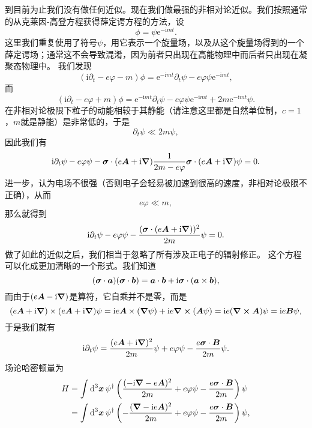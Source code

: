 \documentclass[hyperref, UTF8, a4paper]{ctexart}
\newcommand*{\ii}{\mathrm{i}}
\newcommand*{\ee}{\mathrm{e}}
\begin{document}
到目前为止我们没有做任何近似。现在我们做最强的非相对论近似。我们按照通常的从克莱因-高登方程获得薛定谔方程的方法，设
\[
    \phi = \psi \ee^{-\ii m t}.
\]
这里我们重复使用了符号$\psi$，用它表示一个旋量场，以及从这个旋量场得到的一个薛定谔场；通常这不会导致混淆，因为前者只出现在高能物理中而后者只出现在凝聚态物理中。
我们发现
\[
    (\ii \partial_t - e \varphi - m) \phi = \ee^{-\ii m t} \partial_t \psi - e \varphi \psi \ee^{-\ii m t},
\]
而
\[
    (\ii \partial_t - e \varphi + m) \phi = \ee^{-\ii m t} \partial_t \psi - e \varphi \psi \ee^{-\ii m t} + 2 m \ee^{-\ii m t} \psi.
\]
在非相对论极限下粒子的动能相较于其静能（请注意这里都是自然单位制，$c=1$，$m$就是静能）是非常低的，于是
\[
    \partial_t \psi \ll 2m \psi,
\]
因此我们有
\[
    \ii \partial_t \psi - e \varphi \psi - \vb*{\sigma} \cdot (e\vb*{A} + \ii \grad) \frac{1}{2m - e\varphi} \vb*{\sigma} \cdot (e\vb*{A} + \ii \grad) \psi = 0.
\]
进一步，认为电场不很强（否则电子会轻易被加速到很高的速度，非相对论极限不正确），从而
\[
    e \varphi \ll m,
\]
那么就得到
\begin{equation}
    \ii \partial_t \psi - e \varphi \psi - \frac{(\vb*{\sigma} \cdot (e\vb*{A} + \ii \grad))^2}{2m} \psi = 0.
\end{equation}
做了如此的近似之后，我们相当于忽略了所有涉及正电子的辐射修正。
这个方程可以化成更加清晰的一个形式。我们知道
\[
    (\vb*{\sigma} \cdot \vb*{a}) (\vb*{\sigma} \cdot \vb*{b}) = \vb*{a} \cdot \vb*{b} + \ii \vb*{\sigma} \cdot (\vb*{a} \times \vb*{b}),
\]
而由于$(e\vb*{A} - \ii \grad)$是算符，它自乘并不是零，而是
\[
    (e\vb*{A} + \ii \grad) \times (e\vb*{A} + \ii \grad) \psi = \ii e \vb*{A} \times (\grad{\psi}) + \ii e \curl{(\vb*{A} \psi)} = \ii e  (\curl{\vb*{A}}) \psi = \ii e \vb*{B} \psi,
\]
于是我们就有
\begin{equation}
    \ii \partial_t \psi = \frac{(e \vb*{A} + \ii \grad)^2}{2m} \psi + e \varphi \psi - \frac{e \vb*{\sigma} \cdot \vb*{B}}{2m} \psi.
\end{equation}
场论哈密顿量为
\begin{equation}
    \begin{aligned}
        H &= \int \dd[3]{\vb*{x}} \psi^\dagger \left( \frac{(- \ii \grad - e \vb*{A})^2}{2m} + e \varphi \psi - \frac{e \vb*{\sigma} \cdot \vb*{B}}{2m} \right) \psi \\
        &= \int \dd[3]{\vb*{x}} \psi^\dagger \left( - \frac{(\grad - \ii e \vb*{A})^2}{2m} + e \varphi \psi - \frac{e \vb*{\sigma} \cdot \vb*{B}}{2m} \right) \psi ,
    \end{aligned}
    \label{eq:minimal-coupling}
\end{equation}
\end{document}
